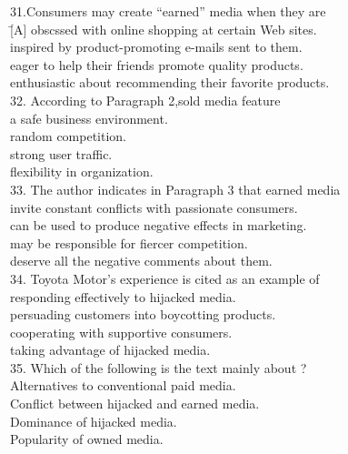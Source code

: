 \begin{tabbing}
31.Consumers may create ``earned'' media when they are\\
\= [A] obscssed with online shopping at certain Web sites.\\
\> [B] inspired by product-promoting e-mails sent to them.\\
\> [C] eager to help their friends promote quality products.\\
\> [D] enthusiastic about recommending their favorite products.\\
32. According to Paragraph 2,sold media feature\\
\> [A] a safe business environment.\\
\> [B] random competition.\\
\> [C] strong user traffic.\\
\> [D] flexibility in organization.\\
33. The author indicates in Paragraph 3 that earned media\\
\> [A] invite constant conflicts with passionate consumers.\\
\> [B] can be used to produce negative effects in marketing.\\
\> [C] may be responsible for fiercer competition.\\
\> [D] deserve all the negative comments about them.\\ 
34. Toyota Motor's experience is cited as an example of\\
\> [A] responding effectively to hijacked media.\\
\> [B] persuading customers into boycotting products.\\
\> [C] cooperating with supportive consumers.\\
\> [D] taking advantage of hijacked media.\\
35. Which of the following is the text mainly about ?\\
\> [A] Alternatives to conventional paid media.\\
\> [B] Conflict between hijacked and earned media.\\
\> [C] Dominance of hijacked media.\\
\> [D] Popularity of owned media.
\end{tabbing}
